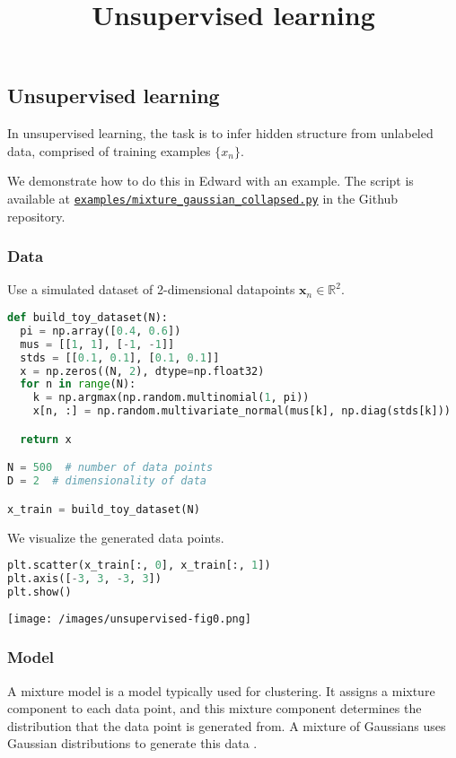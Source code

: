 \title{Unsupervised learning}

\subsection{Unsupervised learning}

In unsupervised learning, the task is to infer hidden structure from
unlabeled data, comprised of training examples $\{x_n\}$.

We demonstrate how to do this in Edward with an example.
The script is available at
\href{https://github.com/blei-lab/edward/blob/master/examples/mixture_gaussian_collapsed.py}
{\texttt{examples/mixture_gaussian_collapsed.py}} in the Github repository.

\subsubsection{Data}

Use a simulated dataset of 2-dimensional datapoints
$\mathbf{x}_n\in\mathbb{R}^2$.
\begin{lstlisting}[language=Python]
def build_toy_dataset(N):
  pi = np.array([0.4, 0.6])
  mus = [[1, 1], [-1, -1]]
  stds = [[0.1, 0.1], [0.1, 0.1]]
  x = np.zeros((N, 2), dtype=np.float32)
  for n in range(N):
    k = np.argmax(np.random.multinomial(1, pi))
    x[n, :] = np.random.multivariate_normal(mus[k], np.diag(stds[k]))

  return x

N = 500  # number of data points
D = 2  # dimensionality of data

x_train = build_toy_dataset(N)
\end{lstlisting}

We visualize the generated data points.
\begin{lstlisting}[language=Python]
plt.scatter(x_train[:, 0], x_train[:, 1])
plt.axis([-3, 3, -3, 3])
plt.show()
\end{lstlisting}
\texttt{[image: /images/unsupervised-fig0.png]}

\subsubsection{Model}

A mixture model is a model typically used for clustering.
It assigns a mixture component to each data point, and this mixture component
determines the distribution that the data point is generated from. A
mixture of Gaussians uses Gaussian distributions to generate this data
\citep{bishop2006pattern}.

